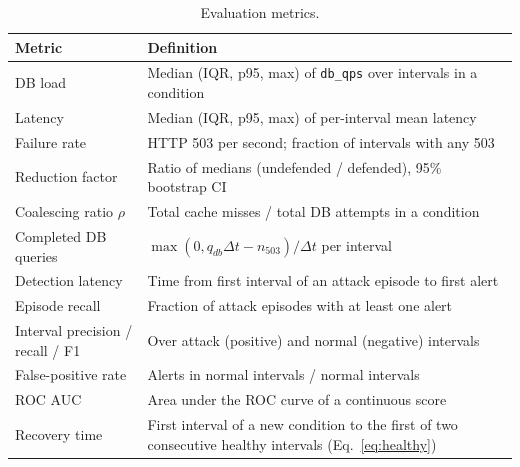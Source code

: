 \begin{table}[t]
\centering
\caption{Evaluation metrics.}
\label{tab:metric-defs}
\small
\begin{tabularx}{\linewidth}{@{}L{3.6cm}Y@{}}
\toprule
Metric & Definition \\
\midrule
DB load & Median (IQR, p95, max) of \texttt{db\_qps} over intervals in a condition \\
Latency & Median (IQR, p95, max) of per-interval mean latency \\
Failure rate & HTTP 503 per second; fraction of intervals with any 503 \\
Reduction factor & Ratio of medians (undefended / defended), 95\% bootstrap CI \cite{efron1994} \\
Coalescing ratio $\rho$ & Total cache misses / total DB attempts in a condition \\
Completed DB queries & $\max(0, q_{db}\Delta t - n_{503})/\Delta t$ per interval \\
Detection latency & Time from first interval of an attack episode to first alert \\
Episode recall & Fraction of attack episodes with at least one alert \\
Interval precision / recall / F1 & Over attack (positive) and normal (negative) intervals \\
False-positive rate & Alerts in normal intervals / normal intervals \\
ROC AUC & Area under the ROC curve of a continuous score \cite{fawcett2006} \\
Recovery time & First interval of a new condition to the first of two consecutive healthy intervals (Eq.~\ref{eq:healthy}) \\
\bottomrule
\end{tabularx}
\end{table}


